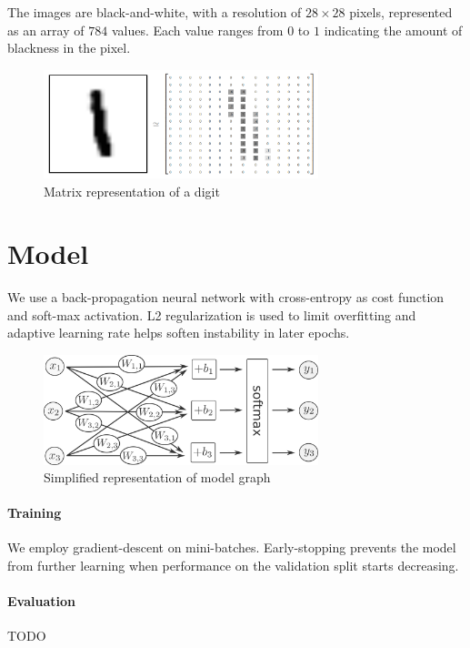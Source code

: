 \documentclass[a4paper]{article}
\begin{document}
The images are black-and-white, with a resolution of $28 \times 28$ pixels, represented as an array of $784$ values. Each value ranges from $0$ to $1$ indicating the amount of blackness in the pixel.

\begin{figure}[htb]
\centering
\includegraphics[width=8cm]{images/mnist-matrix.png}
\caption{Matrix representation of a digit \cite{tf}}
\end{figure}


\newpage
\section{Model}
\label{sec:model}
We use a back-propagation neural network with cross-entropy as cost function and soft-max activation. L2 regularization is used to limit overfitting and adaptive learning rate helps soften instability in later epochs.

\begin{figure}[htb]
\centering
\includegraphics[width=8cm]{images/model-graph.png}
\caption{Simplified representation of model graph \cite{tf}}
\end{figure}

\paragraph{Training} We employ gradient-descent on mini-batches. Early-stopping prevents the model from further learning when performance on the validation split starts decreasing.

\paragraph{Evaluation}
TODO






\newpage

    
    
\end{document}
